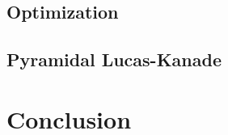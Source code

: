 \documentclass[9pt]{IEEEtran}
\begin{document}
\subsection{Optimization}
\subsection{Pyramidal Lucas-Kanade}

\section{Conclusion}




\end{document}
